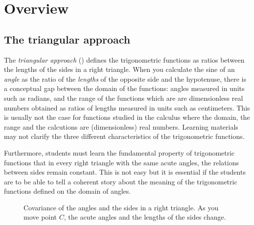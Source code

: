 
\chapter{Overview}\label{ch.overview}

\section{The triangular approach}

The \textit{triangular approach} (\cite{thompson}) defines the trigonometric functions as ratios between the lengths of the sides in a right triangle.
When you calculate the sine of an \emph{angle} as the ratio of the \emph{lengths} of the opposite side and the hypotenuse, there is a conceptual gap between the domain of the functions: angles measured in units such as radians, and the range of the functions which are are dimensionless real numbers obtained as ratios of lengths measured in units such as centimeters. This is usually not the case for functions studied in the calculus where the domain, the range and the calcutions are (dimensionless) real numbers.
Learning materials may not clarify the three different characteristics of the trigonometric functions.

Furthermore, students must learn the fundamental property of trigonometric functions that in every right triangle with the same acute angles, the  relations between sides remain constant. This is not easy but it is essential if the students are to be able to tell a coherent story about the meaning of the trigonometric functions defined on the domain of angles.

\begin{wrapfigure}[17]{r}{.45\textwidth}
\begin{center}
\vspace{-4ex}
\caption{Covariance of the angles and the sides in a right triangle. As you move point $C$, the acute angles and the lengths of the sides change.}\label{fig.covariance}
\end{center}
\end{wrapfigure}

